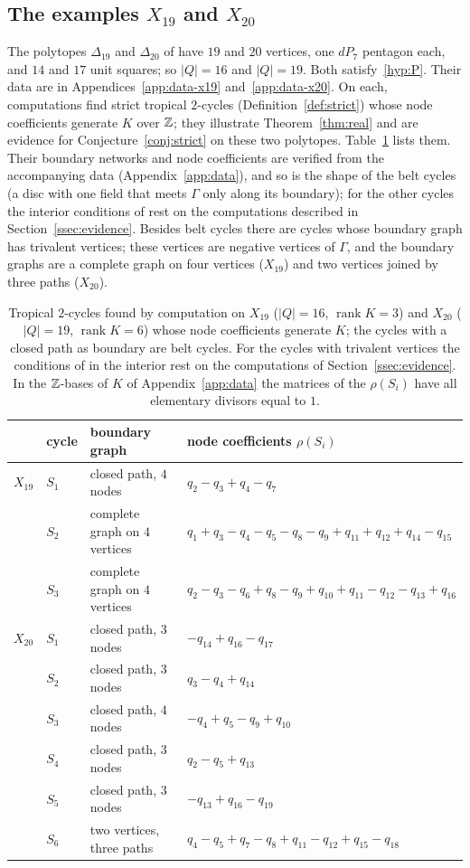 \subsection{The examples \texorpdfstring{$X_{19}$}{X19} and \texorpdfstring{$X_{20}$}{X20}}\label{ssec:x19x20}
The polytopes $\Delta_{19}$ and $\Delta_{20}$ of \cite{Paper4} have $19$ and $20$ vertices, one $dP_7$ pentagon each, and
$14$ and $17$ unit squares; so $|Q|=16$ and $|Q|=19$. Both satisfy~\ref{hyp:P}. Their data are in
Appendices~\ref{app:data-x19} and~\ref{app:data-x20}. On each, computations find strict tropical $2$-cycles
(Definition~\ref{def:strict}) whose node coefficients generate $K$ over $\mathbb Z$; they illustrate Theorem~\ref{thm:real} and are
evidence for Conjecture~\ref{conj:strict} on these two polytopes. Table~\ref{tab:x19x20} lists them. Their boundary
networks and node coefficients are verified from the accompanying data (Appendix~\ref{app:data}), and so is the shape of the belt cycles (a disc with
one field that meets $\Gamma$ only along its boundary); for the other cycles the interior conditions of
\cite[Def.~7.2]{CBM} rest on the computations described in Section~\ref{ssec:evidence}. Besides belt cycles there are
cycles whose boundary graph has trivalent vertices; these vertices are negative vertices of $\Gamma$, and the boundary
graphs are a complete graph on four vertices ($X_{19}$) and two vertices joined by three paths ($X_{20}$).

\begin{table}[ht]
\centering\small
\begin{tabular}{lllp{7.3cm}}
& cycle & boundary graph & node coefficients $\rho(S_i)$\\\hline
$X_{19}$ & $S_1$ & closed path, $4$ nodes & $q_2-q_3+q_4-q_7$\\
 & $S_2$ & complete graph on $4$ vertices & $q_1+q_3-q_4-q_5-q_8-q_9+q_{11}+q_{12}+q_{14}-q_{15}$\\
 & $S_3$ & complete graph on $4$ vertices & $q_2-q_3-q_6+q_8-q_9+q_{10}+q_{11}-q_{12}-q_{13}+q_{16}$\\[2pt]
$X_{20}$ & $S_1$ & closed path, $3$ nodes & $-q_{14}+q_{16}-q_{17}$\\
 & $S_2$ & closed path, $3$ nodes & $q_3-q_4+q_{14}$\\
 & $S_3$ & closed path, $4$ nodes & $-q_4+q_5-q_9+q_{10}$\\
 & $S_4$ & closed path, $3$ nodes & $q_2-q_5+q_{13}$\\
 & $S_5$ & closed path, $3$ nodes & $-q_{13}+q_{16}-q_{19}$\\
 & $S_6$ & two vertices, three paths & $q_4-q_5+q_7-q_8+q_{11}-q_{12}+q_{15}-q_{18}$
\end{tabular}
\caption{Tropical $2$-cycles found by computation on $X_{19}$ ($|Q|=16$, $\operatorname{rank}K=3$) and $X_{20}$ ($|Q|=19$,
$\operatorname{rank}K=6$) whose node coefficients generate $K$; the cycles with a closed path as boundary are belt cycles.
For the cycles with trivalent vertices the conditions of \cite[Def.~7.2]{CBM} in the interior rest on the computations of
Section~\ref{ssec:evidence}.
In the $\mathbb Z$-bases of $K$ of Appendix~\ref{app:data} the matrices of the $\rho(S_i)$ have all elementary divisors equal to
$1$.}\label{tab:x19x20}
\end{table}

